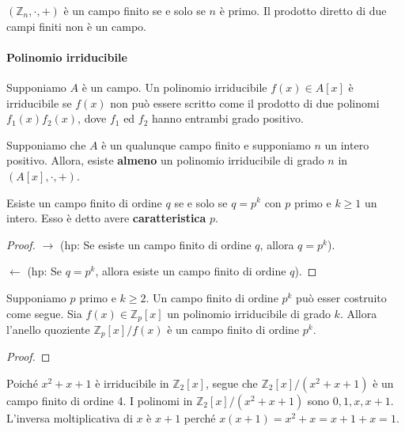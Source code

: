 \vspace{1em} \noindent $(\mathbb{Z}_n, \cdot, +)$ è un campo finito se e solo se $n$ è primo. 
\vspace{1em} \noindent Il prodotto diretto di due campi finiti non è un campo. 

\paragraph{Polinomio irriducibile} Supponiamo $A$ è un campo. Un polinomio irriducibile $f(x) \in A[x]$ è irriducibile se $f(x)$ non può essere scritto come il prodotto di due polinomi $f_1(x)f_2(x)$, dove $f_1$ ed $f_2$ hanno entrambi grado positivo. 

\vspace{1em} \noindent Supponiamo che $A$ è un qualunque campo finito e supponiamo $n$ un intero positivo. Allora, esiste \textbf{almeno} un polinomio irriducibile di grado $n$ in $(A[x], \cdot, +)$. 

\begin{theorem}
    Esiste un campo finito di ordine $q$ se e solo se $q=p^k$ con $p$ primo e $k \geq 1$ un intero.  Esso è detto avere \textbf{caratteristica} $p$. 
\end{theorem}

\begin{proof}

    $\rightarrow$ (hp: Se esiste un campo finito di ordine $q$, allora $q=p^k$).

    $\leftarrow$ (hp: Se $q=p^k$, allora esiste un campo finito di ordine $q$). 

    
\end{proof}

\newpage

\begin{theorem}
    Supponiamo $p$ primo e $k \geq 2$. Un campo finito di ordine $p^k$ può esser costruito come segue. Sia $f(x) \in \mathbb{Z}_p[x]$ un polinomio irriducibile di grado $k$. Allora l'anello quoziente $\mathbb{Z}_p[x]/f(x)$ è un campo finito di ordine $p^k$. 
\end{theorem}

\begin{proof}
    
\end{proof}
\begin{example}
    Poiché $x^2+x+1$ è irriducibile in $\mathbb{Z}_2[x]$, segue che $\mathbb{Z}_2[x]/(x^2+x+1)$ è un campo finito di ordine 4. I polinomi in $\mathbb{Z}_2[x]/(x^2+x+1)$ sono $0,1,x,x+1$. \\ L'inversa moltiplicativa di $x$ è $x+1$ perché $x(x+1)=x^2+x=x+1+x=1$. 
\end{example}
